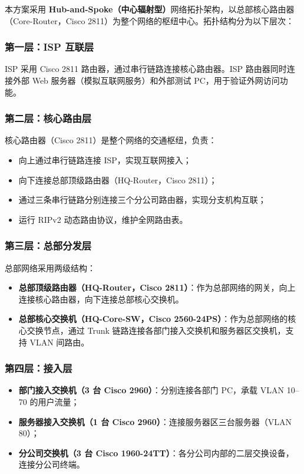 \documentclass[12pt,a4paper]{ctexart}
\begin{document}
本方案采用 \textbf{Hub-and-Spoke（中心辐射型）}网络拓扑架构，以总部核心路由器（Core-Router，Cisco 2811）为整个网络的枢纽中心。拓扑结构分为以下层次：

\subsubsection{第一层：ISP 互联层}

ISP 采用 Cisco 2811 路由器，通过串行链路连接核心路由器。ISP 路由器同时连接外部 Web 服务器（模拟互联网服务）和外部测试 PC，用于验证外网访问功能。

\subsubsection{第二层：核心路由层}

核心路由器（Cisco 2811）是整个网络的交通枢纽，负责：
\begin{itemize}
    \item 向上通过串行链路连接 ISP，实现互联网接入；
    \item 向下连接总部顶级路由器（HQ-Router，Cisco 2811）；
    \item 通过三条串行链路分别连接三个分公司路由器，实现分支机构互联；
    \item 运行 RIPv2 动态路由协议，维护全网路由表。
\end{itemize}

\subsubsection{第三层：总部分发层}

总部网络采用两级结构：
\begin{itemize}
    \item \textbf{总部顶级路由器（HQ-Router，Cisco 2811）}：作为总部网络的网关，向上连接核心路由器，向下连接总部核心交换机。
    \item \textbf{总部核心交换机（HQ-Core-SW，Cisco 2560-24PS）}：作为总部网络的核心交换节点，通过 Trunk 链路连接各部门接入交换机和服务器区交换机，支持 VLAN 间路由。
\end{itemize}

\subsubsection{第四层：接入层}

\begin{itemize}
    \item \textbf{部门接入交换机（3 台 Cisco 2960）}：分别连接各部门 PC，承载 VLAN 10--70 的用户流量；
    \item \textbf{服务器接入交换机（1 台 Cisco 2960）}：连接服务器区三台服务器（VLAN 80）；
    \item \textbf{分公司交换机（3 台 Cisco 1960-24TT）}：各分公司内部的二层交换设备，连接分公司终端。
\end{itemize}
\end{document}
